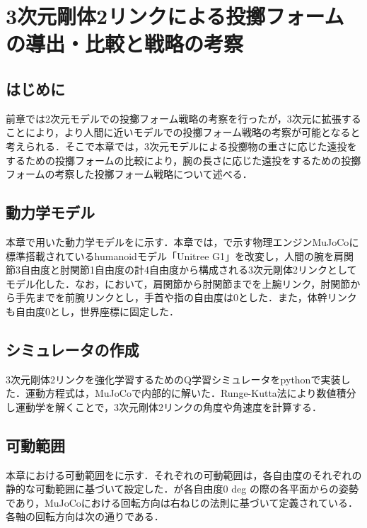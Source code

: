 
\chapter[3次元剛体2リンクによる投擲フォームの導出・比較と戦略の考察]{3次元剛体2リンクによる投擲フォームの導出・比較と戦略の考察}

\section{はじめに}
前章では2次元モデルでの投擲フォーム戦略の考察を行ったが，3次元に拡張することにより，より人間に近いモデルでの投擲フォーム戦略の考察が可能となると考えられる．そこで本章では，3次元モデルによる投擲物の重さに応じた遠投をするための投擲フォームの比較により，腕の長さに応じた遠投をするための投擲フォームの考察した投擲フォーム戦略について述べる．
\section{動力学モデル}
本章で用いた動力学モデルをに示す．本章では，で示す物理エンジンMuJoCo\cite{mujoco}\cite{mujoco2}に標準搭載されているhumanoidモデル「Unitree G1」\cite{unitreeg1}を改変し，人間の腕を肩関節3自由度と肘関節1自由度の計4自由度から構成される3次元剛体2リンクとしてモデル化した．なお，において，肩関節から肘関節までを上腕リンク，肘関節から手先までを前腕リンクとし，手首や指の自由度は0とした．また，体幹リンクも自由度0とし，世界座標に固定した．


\section{シミュレータの作成}
3次元剛体2リンクを強化学習するためのQ学習シミュレータをpythonで実装した．運動方程式は，MuJoCoで内部的に解いた．Runge-Kutta法により数値積分し運動学を解くことで，3次元剛体2リンクの角度や角速度を計算する．
\section{可動範囲}
本章における可動範囲をに示す．それぞれの可動範囲は，各自由度のそれぞれの静的な可動範囲\cite{range}に基づいて設定した．が各自由度0 deg の際の各平面からの姿勢であり，MuJoCoにおける回転方向は右ねじの法則に基づいて定義されている．各軸の回転方向は次の通りである．

